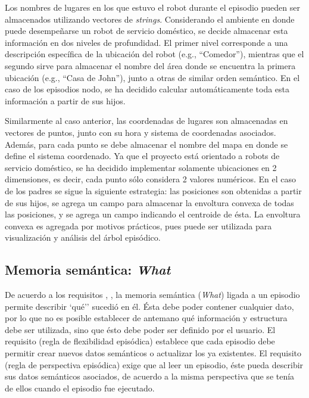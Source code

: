 Los nombres de lugares en los que estuvo el robot durante el episodio pueden ser almacenados utilizando vectores de \textit{strings}. Considerando el ambiente en donde puede desempeñarse un robot de servicio doméstico, se decide almacenar esta información en dos niveles de profundidad. El primer nivel corresponde a una descripción específica de la ubicación del robot (e.g., ``Comedor''), mientras que el segundo sirve para almacenar el nombre del área donde se encuentra la primera ubicación (e.g., ``Casa de John''), junto a otras de similar orden semántico. En el caso de los episodios nodo, se ha decidido calcular automáticamente toda esta información a partir de sus hijos.

Similarmente al caso anterior, las coordenadas de lugares son almacenadas en vectores de puntos, junto con su hora y sistema de coordenadas asociados. Además, para cada punto se debe almacenar el nombre del mapa en donde se define el sistema coordenado. Ya que el proyecto está orientado a robots de servicio doméstico, se ha decidido implementar solamente ubicaciones en 2 dimensiones, es decir, cada punto sólo considera 2 valores numéricos. En el caso de los padres se sigue la siguiente estrategia: las posiciones son obtenidas a partir de sus hijos, se agrega un campo para almacenar la envoltura convexa de todas las posiciones, y se agrega un campo indicando el centroide de ésta. La envoltura convexa es agregada por motivos prácticos, pues puede ser utilizada para visualización y análisis del árbol episódico.



\subsection{Memoria semántica: \textit{What}}\label{sec:design_ep_what}

De acuerdo a los requisitos , , la memoria semántica (\textit{What}) ligada a un episodio permite describir `qué'' sucedió en él. Ésta debe poder  contener cualquier dato, por lo que no es posible establecer de antemano qué información y estructura debe ser utilizada, sino que ésto debe poder ser definido por el usuario. El requisito  (regla de flexibilidad episódica) establece que cada episodio debe permitir crear nuevos datos semánticos o actualizar los ya existentes. El requisito  (regla de perspectiva episódica) exige que al leer un episodio, éste pueda describir sus datos semánticos asociados, de acuerdo a la misma perspectiva que se tenía de ellos cuando el episodio fue ejecutado.

